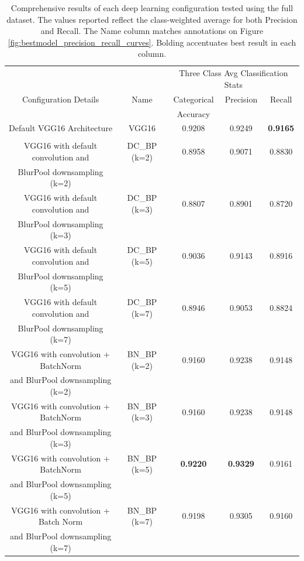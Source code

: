 \begin{table}[ht]
	\centering
	\begin{tabular}{ccccc}
		& & \multicolumn{3}{c}{ Three Class Avg Classification Stats } \\
		Configuration Details & Name & Categorical & Precision & Recall \\
		&      & Accuracy    &           &        \\
		Default VGG16 Architecture & VGG16 & 0.9208 & 0.9249 & \textbf{0.9165} \\
		& & & & \\
		VGG16 with default convolution and & DC\_BP (k=2) & 0.8958 & 0.9071 & 0.8830 \\
		BlurPool downsampling (k=2) & & & & \\
		VGG16 with default convolution and & DC\_BP (k=3) & 0.8807 & 0.8901 & 0.8720 \\
		BlurPool downsampling (k=3) & & & & \\
		VGG16 with default convolution and & DC\_BP (k=5) & 0.9036 & 0.9143 & 0.8916 \\
		BlurPool downsampling (k=5) & & & & \\
		VGG16 with default convolution and & DC\_BP (k=7) & 0.8946 & 0.9053 & 0.8824 \\
		BlurPool downsampling (k=7) & & & & \\
		VGG16 with convolution + BatchNorm & BN\_BP (k=2) & 0.9160 & 0.9238 & 0.9148 \\
		and BlurPool downsampling (k=2) & & & & \\
		VGG16 with convolution + BatchNorm & BN\_BP (k=3) & 0.9160 & 0.9238 & 0.9148 \\
		and BlurPool downsampling (k=3) & & & & \\
		VGG16 with convolution + BatchNorm & BN\_BP (k=5) & \textbf{0.9220} & \textbf{0.9329} & 0.9161 \\
		and BlurPool downsampling (k=5) & & & & \\
		VGG16 with convolution + Batch Norm & BN\_BP (k=7) & 0.9198 & 0.9305 & 0.9160 \\
		and BlurPool downsampling (k=7) & & & & \\
	\end{tabular}
	\caption{Comprehensive results of each deep learning configuration tested using the full dataset. The values reported reflect the class-weighted average for both Precision and Recall. The Name column matches annotations on Figure \ref{fig:bestmodel_precision_recall_curves}. Bolding accentuates best result in each column.}
	\label{table:experiment_results}
\end{table}

